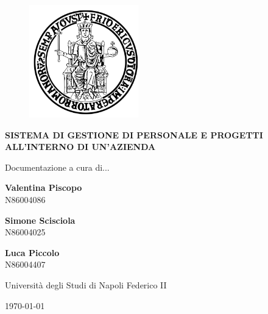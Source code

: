 \documentclass{report}
\begin{document}
\begin{titlepage}
    \setcounter{chapter}{-1}
    \begin{figure}[htbp!]
        \begin{center}
            \includegraphics[width=.25\textwidth]{Logo/FedericoII.png}
        \end{center}
    \end{figure}
    
    \begin{center}
        \LARGE\bfseries SISTEMA DI GESTIONE DI PERSONALE E PROGETTI ALL’INTERNO DI UN’AZIENDA
    \end{center}
    
    \begin{center}
        \vspace{8\baselineskip}

        {\LARGE Documentazione a cura di...}\\
        \vspace{2\baselineskip}
        
        {\large \bfseries Valentina Piscopo} \\
        N86004086
	  \vspace{1\baselineskip}

        {\large \bfseries Simone Scisciola} \\
        N86004025
	  \vspace{1\baselineskip}

        {\large \bfseries Luca Piccolo} \\
        N86004407
        \vspace{13\baselineskip}

        {\LARGE Università degli Studi di Napoli Federico II}
	  \vspace{1\baselineskip}

	  {\large \today}
   
    \end{center}
\end{titlepage}

\newpage
    \tableofcontents
    
    
    
    
    
    
    
\end{document}
